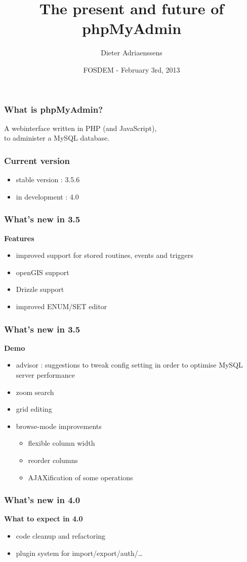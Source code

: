 \documentclass[14pt]{beamer}
\title{The present and future of phpMyAdmin}
\author{Dieter Adriaenssens}
\institute[phpMyAdmin]{phpMyAdmin developer}
\date[FOSDEM - 3Feb2013]{FOSDEM - February 3rd, 2013}
\begin{document}
  \begin{frame}
  \titlepage
  \end{frame}
  \begin{frame}
    \frametitle{What is phpMyAdmin?}
      A webinterface written in PHP (and JavaScript),\\
      to administer a MySQL database.
  \end{frame}
  \begin{frame}
    \frametitle{Current version}
    \begin{itemize}[<+->]
      \item stable version : 3.5.6
      \item in development : 4.0
    \end{itemize}
  \end{frame}
  \begin{frame}
    \frametitle{What's new in 3.5}
   \textbf{{\color{PmaOlive}Features}}
    \pause
    \begin{itemize}[<+->]
      \item improved support for stored routines, events and triggers
      \item openGIS support
      \item Drizzle support
      \item improved ENUM/SET editor
    \end{itemize}
  \end{frame}
  \begin{frame}
    \frametitle{What's new in 3.5}
    \textbf{{\color{PmaOlive}Demo}}
    \begin{itemize}
      \item advisor : suggestions to tweak config setting in order to optimise MySQL server performance
      \item zoom search
      \item grid editing
      \item browse-mode improvements
      \begin{itemize}
        \item flexible column width
        \item reorder columns
        \item AJAXification of some operations
      \end{itemize}
    \end{itemize}
  \end{frame}
  \begin{frame}
    \frametitle{What's new in 4.0}
    \textbf{{\color{PmaOlive}What to expect in 4.0}}
    \pause
    \begin{itemize}[<+->]
      \item code cleanup and refactoring
      \item plugin system for import/export/auth/\ldots
    \end{itemize}
  \end{frame}
\end{document}
